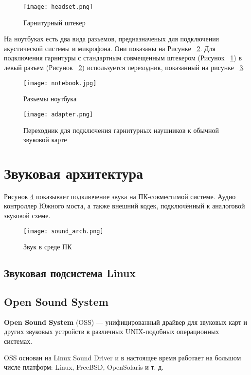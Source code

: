 \begin{figure}[h]
  \centering
  \texttt{[image: headset.png]}
  \caption{Гарнитурный штекер}
  \label{image:headset}
\end{figure}

На ноутбуках есть два вида разъемов, предназначеных для подключения акустической системы и микрофона. Они показаны на Рисунке ~\ref{image:notebook}. Для подключения гарнитуры с стандартным совмещенным штекером (Рисунок ~\ref{image:headset}) в левый разъем (Рисунок ~\ref{image:notebook}) используется переходник, показанный на рисунке ~\ref{image:adapter}.

\begin{figure}[h]
  \centering
  \texttt{[image: notebook.jpg]}
  \caption{Разъемы ноутбука}
  \label{image:notebook}
\end{figure}

\begin{figure}[h]
  \centering
  \texttt{[image: adapter.png]}
  \caption{Переходник для подключения гарнитурных наушников к обычной звуковой карте}
  \label{image:adapter}
\end{figure}

\section{Звуковая архитектура}

Рисунок \ref{image:sound_arch} показывает подключение звука на ПК-совместимой системе. Аудио контроллер Южного моста, а также внешний кодек, подключённый к аналоговой звуковой схеме. \cite{eldd}

\begin{figure}[h]
  \centering
  \texttt{[image: sound\_arch.png]}
  \caption{Звук в среде ПК}
  \label{image:sound_arch}
\end{figure}

\subsection{Звуковая подсистема Linux}

\subsection{Open Sound System}
\textbf{Open Sound System} (OSS) — унифицированный драйвер для звуковых карт и других звуковых устройств в различных UNIX-подобных операционных системах.

OSS основан на Linux Sound Driver и в настоящее время работает на большом числе платформ: Linux, FreeBSD, OpenSolaris и т. д. \cite{wiki-oss}

